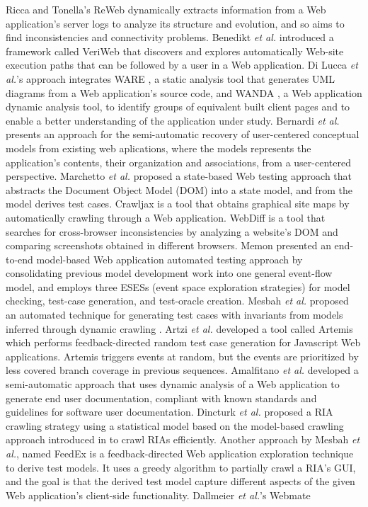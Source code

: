 Ricca and Tonella's ReWeb \cite{ricca2001understanding} dynamically extracts information from a Web application's server logs to analyze its structure and evolution, and so aims to find inconsistencies and connectivity problems. Benedikt \textit{et al.} introduced a framework called VeriWeb \cite{benedikt2002veriWeb} that discovers and explores automatically Web-site execution paths that can be followed by a user in a Web application. Di Lucca \textit{et al.}'s approach \cite{di2005integrating} integrates WARE \cite{di2004reverse}, a static analysis tool that generates UML diagrams from a Web application's source code, and WANDA \cite{antoniol2004understanding}, a Web application dynamic analysis tool, to identify groups of equivalent built client pages and to enable a better understanding of the application under study. Bernardi \textit{et al.} \cite{bernardi2008reverse} presents an approach for the semi-automatic recovery of user-centered conceptual models from existing web aplications, where the models represents the application's contents, their organization and associations, from a user-centered perspective. Marchetto \textit{et al.} proposed a state-based Web testing approach \cite{marchetto2008state} that abstracts the Document Object Model (DOM) into a state model, and from the model derives test cases. Crawljax \cite{roest2010automated} is a tool that obtains graphical site maps by automatically crawling through a Web application. WebDiff \cite{choudhary2010Webdiff} is a tool that searches for cross-browser inconsistencies by analyzing a website's DOM and comparing screenshots obtained in different browsers. Memon presented an end-to-end model-based Web application automated testing approach \cite{memon2007event} by consolidating previous model development work into one general event-flow model, and employs three ESESs (event space exploration strategies) for model checking, test-case generation, and test-oracle creation. Mesbah \textit{et al.} proposed an automated technique for generating test cases with invariants from models inferred through dynamic crawling \cite{mesbah2012invariant}. Artzi \textit{et al.} developed a tool called Artemis \cite{artzi2011framework} which performs feedback-directed random test case generation for Javascript Web applications. Artemis triggers events at random, but the events are prioritized by less covered branch coverage in previous sequences. Amalfitano \textit{et al.} developed a semi-automatic approach \cite{amalfitano2011using} that uses dynamic analysis of a Web application to generate end user documentation, compliant with known standards and guidelines for software user documentation. Dincturk \textit{et al.} \cite{dincturk2012statistical} proposed a RIA crawling strategy using a statistical model based on the model-based crawling approach introduced in \cite{benjamin2011strategy} to crawl RIAs efficiently. Another approach by Mesbah \textit{et al.}, named FeedEx \cite{fard2013feedback} is a feedback-directed Web application exploration technique to derive test models. It uses a greedy algorithm to partially crawl a RIA's GUI, and the goal is that the derived test model capture different aspects of the given Web application's client-side functionality.  Dallmeier \textit{et al.}'s Webmate 
